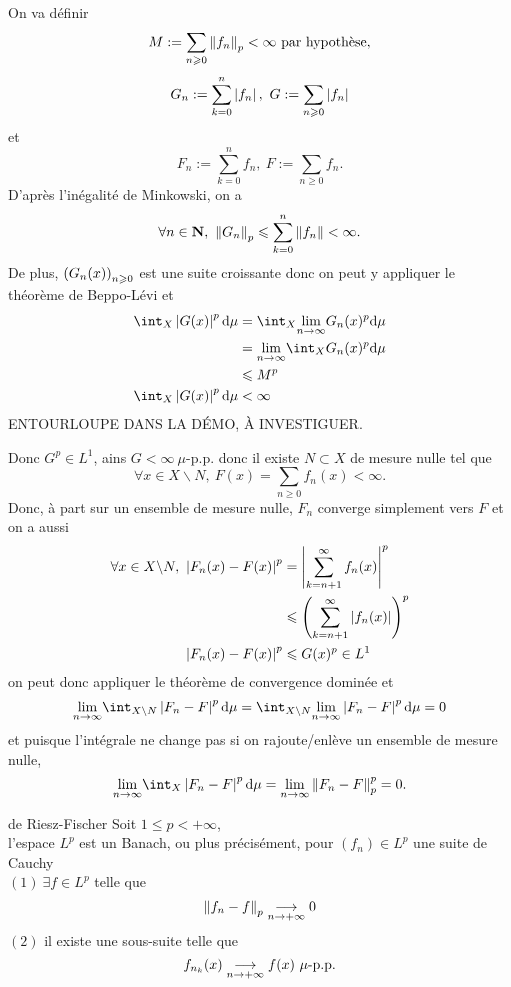 \documentclass[a4paper,11pt, twoside]{article}
\begin{document}
\begin{Proof}
  On va définir 
  $$M:=\sum_{n\geqslant 0}\left\lVert f_n\right\rVert_p<\infty\text{ par hypothèse},$$
  $$G_n:=\sum_{k=0}^n\left| f_n\right|,\ G:=\sum_{n\geqslant 0}\left| f_n\right|$$
  et
  $$F_n:=\sum_{k=0}^nf_n,\ F:=\sum_{n\geqslant 0}f_n.$$
  D'après l'inégalité de Minkowski, on a 
  $$\forall n\in\mathbf N,\ \left\lVert G_n\right\rVert_p\leqslant \sum_{k=0}^n\left\lVert f_n\right\rVert<\infty.$$
  De plus, $\left(G_n(x)\right)_{n\geqslant 0}$ est une suite croissante donc on peut y appliquer le théorème de Beppo-Lévi et 
  \begin{align*}
    \int_X \abs{G(x)}^p\mathrm d\mu&=\int_X\underset{n\to\infty}{\mathrm{lim}}G_n(x)^p\mathrm d\mu\\
    &=\underset{n\to\infty}{\mathrm{lim}}\int_XG_n(x)^p\mathrm d\mu\\
    &\leqslant M^p\\
    \int_X \abs{G(x)}^p\mathrm d\mu&<\infty
  \end{align*}
  ENTOURLOUPE DANS LA DÉMO, À INVESTIGUER.

  Donc $G^p\in L^1$, ains $G<\infty\ \mu$-p.p. donc il existe $N\subset X$ de mesure nulle tel que 
  $$\forall x\in X\backslash N,\ F(x)=\sum_{n\geqslant 0}f_n(x)<\infty.$$
  Donc, à part sur un ensemble de mesure nulle, $F_n$ converge simplement vers $F$ et on a aussi 
  \begin{align*}
    \forall x\in X\backslash N,\ \abs{F_n(x)-F(x)}^p&=\abs{\sum_{k=n+1}^\infty f_n(x)}^p\\
    &\leqslant \Par{\sum_{k=n+1}^\infty \abs{f_n(x)}}^p\\
    \abs{F_n(x)-F(x)}^p&\leqslant G(x)^p\in L^1
  \end{align*}
  on peut donc appliquer le théorème de convergence dominée et 
  $$\Lim \int_{X\backslash N}\abs{F_n-F }^p\mathrm d\mu=\int_{X\backslash N}\Lim\abs{F_n-F }^p\mathrm d\mu=0$$
  et puisque l'intégrale ne change pas si on rajoute/enlève un ensemble de mesure nulle, 
  $$\Lim \int_X\abs{F_n-F }^p\mathrm d\mu=\Lim\norm{F_n-F}_p^p=0.$$
\end{Proof}


\begin{thC}{de Riesz-Fischer}
  Soit $1\leqslant p<+\infty$,\\

  l'espace $L^p$ est un Banach, ou plus précisément, pour $(f_n)\in L^p$ une suite de Cauchy\\
  $(\mathit 1)\ \exists f\in L^p$ telle que 
  $$\left\lVert f_n-f\right\rVert_p\underset{n\to+\infty}{\longrightarrow} 0$$
  $(\mathit 2)$ il existe une sous-suite telle que 
  $$f_{n_k}(x)\tend f(x)\ \mu\text{-p.p.}$$
\end{thC}
\end{document}

